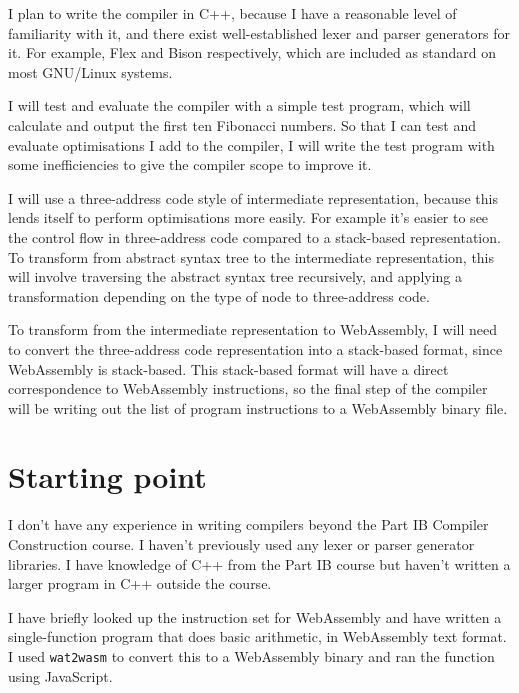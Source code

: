 I plan to write the compiler in C++, because I have a reasonable level of familiarity with it, and there exist well-established lexer and parser generators for it. For example, Flex and Bison respectively, which are included as standard on most GNU/Linux systems.

I will test and evaluate the compiler with a simple test program, which will calculate and output the first ten Fibonacci numbers. So that I can test and evaluate optimisations I add to the compiler, I will write the test program with some inefficiencies to give the compiler scope to improve it.



I will use a three-address code style of intermediate representation, because this lends itself to perform optimisations more easily. For example it's easier to see the control flow in three-address code compared to a stack-based representation.
To transform from abstract syntax tree to the intermediate representation, this will involve traversing the abstract syntax tree recursively, and applying a transformation depending on the type of node to three-address code.



To transform from the intermediate representation to WebAssembly, I will need to convert the three-address code representation into a stack-based format, since WebAssembly is stack-based. This stack-based format will have a direct correspondence to WebAssembly instructions, so the final step of the compiler will be writing out the list of program instructions to a WebAssembly binary file.





\section*{Starting point}

I don't have any experience in writing compilers beyond the Part IB Compiler Construction course. I haven't previously used any lexer or parser generator libraries. I have knowledge of C++ from the Part IB course but haven't written a larger program in C++ outside the course.

I have briefly looked up the instruction set for WebAssembly and have written a single-function program that does basic arithmetic, in WebAssembly text format. I used \texttt{wat2wasm} to convert this to a WebAssembly binary and ran the function using JavaScript.

